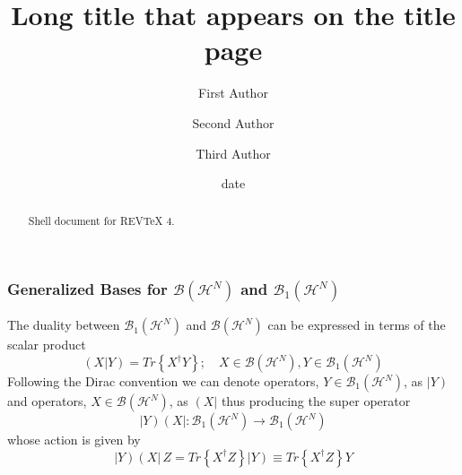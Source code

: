 \documentclass[aps,preprint]{revtex4}%
\begin{document}
\title[Short title for running header]{Long title that appears on the title page}
\author{First Author}
\author{Second Author}
\author{Third Author}

\begin{abstract}
Shell document for REV\TeX{} 4.

\end{abstract}
\date[Date text]{date}




\maketitle
\tableofcontents


\subsubsection{Generalized Bases for $\mathcal{B}\left(  \mathcal{H}%
^{N}\right)  $ and $\mathcal{B}_{1}\left(  \mathcal{H}^{N}\right)  $}

The duality between $\mathcal{B}_{1}\left(  \mathcal{H}^{N}\right)  $ and
$\mathcal{B}\left(  \mathcal{H}^{N}\right)  $ can be expressed in terms of the
scalar product
\begin{equation}
\left(  X|Y\right)  =Tr\left\{  X^{\dagger}Y\right\}  ;\quad X\in
\mathcal{B}\left(  \mathcal{H}^{N}\right)  ,Y\in\mathcal{B}_{1}\left(
\mathcal{H}^{N}\right)
\end{equation}
Following the Dirac convention we can denote operators, $Y\in\mathcal{B}%
_{1}\left(  \mathcal{H}^{N}\right)  $, as $\left\vert Y\right)  $ and
operators, $X\in\mathcal{B}\left(  \mathcal{H}^{N}\right)  $, as $\left(
X\right\vert $ thus producing the super operator%
\begin{equation}
\left\vert Y\right)  \left(  X\right\vert :\mathcal{B}_{1}\left(
\mathcal{H}^{N}\right)  \rightarrow\mathcal{B}_{1}\left(  \mathcal{H}%
^{N}\right)
\end{equation}
whose action is given by
\begin{equation}
\left\vert Y\right)  \left(  X\right\vert \,Z=Tr\left\{  X^{\dagger}Z\right\}
\left\vert Y\right)  \equiv Tr\left\{  X^{\dagger}Z\right\}  Y
\end{equation}
\end{document}
